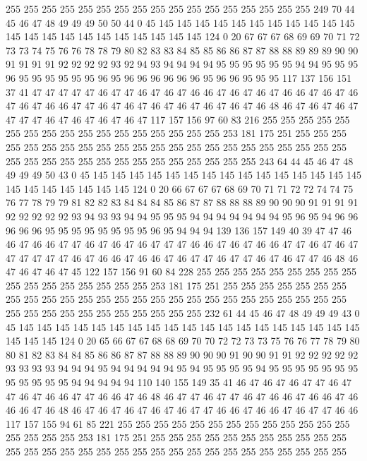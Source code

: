 255 255 255 255 255 255 255 255 255 255 255 255 255 255 255 255 255 249 70 44
45 46 47 48 49 49 49 50 50 44 0 45 145 145 145 145 145 145 145 145
145 145 145 145 145 145 145 145 145 145 145 145 145 145 124 0 20 67 67 67
68 69 69 70 71 72 73 73 74 75 76 76 78 78 79 80 82 83 83 84
85 85 86 86 87 87 88 88 89 89 89 90 90 91 91 91 91 92 92 92
92 93 92 94 93 94 94 94 94 95 95 95 95 95 95 94 94 95 95 95
96 95 95 95 95 95 95 96 95 96 96 96 96 96 96 95 96 96 95 95
95 117 137 156 151 37 41 47 47 47 47 47 46 47 47 46 47 46 47 46
46 47 46 47 46 47 46 46 47 46 47 46 47 46 47 46 46 47 47 46
47 46 47 46 47 46 47 46 47 46 47 46 48 46 47 46 47 46 47 47
47 47 46 47 46 47 46 47 46 47 117 157 156 97 60 83 216 255 255 255
255 255 255 255 255 255 255 255 255 255 255 255 255 255 253 181 175 251 255 255
255 255 255 255 255 255 255 255 255 255 255 255 255 255 255 255 255 255 255 255
255 255 255 255 255 255 255 255 255 255 255 255 255 255 243 64 44 45 46 47
48 49 49 49 50 43 0 45 145 145 145 145 145 145 145 145 145 145 145 145
145 145 145 145 145 145 145 145 145 145 124 0 20 66 67 67 67 68 69 70
71 71 72 72 74 74 75 76 77 78 79 79 81 82 82 83 84 84 84 85
86 87 87 88 88 88 89 90 90 90 91 91 91 91 92 92 92 92 92 93
94 93 93 94 94 95 95 95 94 94 94 94 94 94 94 95 96 95 94 96
96 96 96 96 95 95 95 95 95 95 95 95 96 95 94 94 94 139 136 157
149 40 39 47 47 46 46 47 46 46 47 47 46 47 46 47 46 47 47 47
46 46 47 46 47 46 46 47 47 46 47 46 47 47 47 47 47 47 46 47
46 46 47 46 46 47 46 47 47 46 47 47 46 47 46 47 47 46 48 46
47 46 47 46 47 45 122 157 156 91 60 84 228 255 255 255 255 255 255 255
255 255 255 255 255 255 255 255 255 255 253 181 175 251 255 255 255 255 255 255
255 255 255 255 255 255 255 255 255 255 255 255 255 255 255 255 255 255 255 255
255 255 255 255 255 255 255 255 255 255 255 232 61 44 45 46 47 48 49 49
49 43 0 45 145 145 145 145 145 145 145 145 145 145 145 145 145 145 145 145
145 145 145 145 145 145 124 0 20 65 66 67 67 68 68 69 70 70 72 72
73 73 75 76 76 77 78 79 80 80 81 82 83 84 84 85 86 86 87 87
88 88 89 90 90 90 91 90 90 91 91 92 92 92 92 92 93 93 93 93
94 94 94 95 94 94 94 94 94 95 94 95 95 95 95 94 95 95 95 95
95 95 95 95 95 95 95 95 94 94 94 94 94 110 140 155 149 35 41 46
47 46 47 46 47 47 46 47 47 46 47 46 46 47 47 46 46 47 46 48
46 47 47 46 47 47 46 47 46 46 47 46 46 47 46 46 46 47 46 48
46 47 46 47 46 47 46 47 46 47 47 46 46 47 46 46 47 46 47 47
46 46 117 157 155 94 61 85 221 255 255 255 255 255 255 255 255 255 255 255
255 255 255 255 255 255 253 181 175 251 255 255 255 255 255 255 255 255 255 255
255 255 255 255 255 255 255 255 255 255 255 255 255 255 255 255 255 255 255 255
